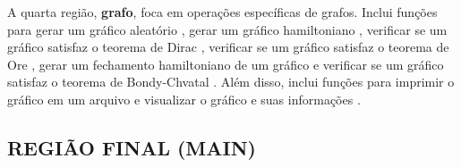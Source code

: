 \documentclass[12pt, openright, oneside, a4paper, chapter=TITLE, section=TITLE, subsection=TITLE, subsubsection=TITLE, brazil]{abntex2}
\begin{document}
A quarta região, \textbf{grafo}, foca em operações específicas de grafos. Inclui funções para gerar um gráfico aleatório , gerar um gráfico hamiltoniano , verificar se um gráfico satisfaz o teorema de Dirac , verificar se um gráfico satisfaz o teorema de Ore , gerar um fechamento hamiltoniano de um gráfico  e verificar se um gráfico satisfaz o teorema de Bondy-Chvatal . Além disso, inclui funções para imprimir o gráfico em um arquivo  e visualizar o gráfico e suas informações .

\subsection{REGIÃO FINAL (MAIN)}
\end{document}
